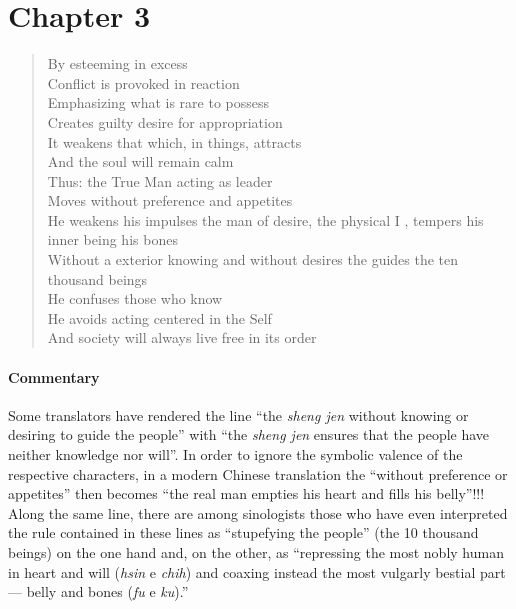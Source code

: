 \section{Chapter 3}

\begin{quotex}
\begin{verse}
By esteeming in excess\\ Conflict is provoked in reaction \\ Emphasizing what is rare to possess\\ Creates guilty desire for appropriation\\ It weakens that which, in things, attracts\\ And the soul will remain calm\\ Thus: the True Man acting as leader\\ Moves without preference and appetites\\ He weakens his impulses the man of desire, the physical I , tempers his inner being his bones \\ Without a exterior knowing and without desires the guides the ten thousand beings\\ He confuses those who know\\ He avoids acting centered in the Self \\ And society will always live free in its order
\end{verse}
\end{quotex}


\paragraph{Commentary}


Some translators have rendered the line ``the \emph{sheng jen} without knowing or desiring to guide the people'' with ``the \emph{sheng jen} ensures that the people have neither knowledge nor will''. In order to ignore the symbolic valence of the respective characters, in a modern Chinese translation the ``without preference or appetites'' then becomes ``the real man empties his heart and fills his belly''!!! Along the same line, there are among sinologists those who have even interpreted the rule contained in these lines as ``stupefying the people'' (the 10 thousand beings) on the one hand and, on the other, as ``repressing the most nobly human in heart and will (\emph{hsin} e \emph{chih}) and coaxing instead the most vulgarly bestial part --- belly and bones (\emph{fu} e \emph{ku}).''

